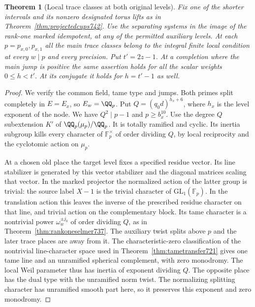 \documentclass[a4paper,11pt]{article}
\newtheorem{theorem}[proposition]{Theorem}
\theoremstyle{definition}
\theoremstyle{remark}
\numberwithin{equation}{section}
\begin{document}
\begin{theorem}[Local trace classes at both original levels]
\leavevmode\label{thm:oldtorustraces743}
Fix one of the shorter intervals and its nonzero designated torus
lifts as in Theorem~\ref{thm:projectedcups742}. Use the separating
systems in the image of the rank-one marked idempotent, at any of
the permitted auxiliary levels. At each \(p=p_{x,0},p_{x,1}\)
all the main trace classes belong to the integral finite local
condition at every \(w\mid p\) and every precision. Put
\(t'=2z-1\). At a completion where the main jump is positive the
same assertion holds for all the scalar weights \(0\le h<t'\).
At its conjugate it holds for \(h=t'-1\) as well.
\end{theorem}
\begin{proof}
We verify the common field, tame type and jumps. Both primes split
completely in \(E=E_x\), so \(E_w=\QQ_p\). Put \(Q=(q_0d)^{h_x+6}\),
where \(h_x\) is the level exponent of the node. We have
\(Q^2\mid p-1\) and \(p\ge b_x^{10}\). Use the degree \(Q\)
subextension \(K'\) of \(\QQ_p(\mu_p)/\QQ_p\). It is totally
ramified and cyclic. Its inertia subgroup kills every character
of \(\mathbb F_p^\times\) of order dividing \(Q\), by local
reciprocity and the cyclotomic action on \(\mu_p\).

At a chosen old place the target level fixes a specified residue
vector. Its line stabilizer is generated by this vector stabilizer
and the diagonal matrices scaling that vector. In the marked
projector the normalized action of the latter group is trivial:
the source label \(X-1\) is the trivial character of
\(\mathrm{GL}_1(\mathbb F_p)\). In the translation action this
leaves the inverse of the prescribed residue character on that
line, and trivial action on the complementary block. Its tame
character is a nontrivial power \(\omega_w^{\pm j_0}\) of order
dividing \(Q\), as in Theorem~\ref{thm:rankoneselmer737}.
The auxiliary twist splits above \(p\) and the later trace places
are away from it. The characteristic-zero classification of the
nontrivial line-character space used in
Theorem~\ref{thm:tametransfer721} gives one tame line and an
unramified spherical complement, with zero monodromy. The local
Weil parameter thus has inertia of exponent dividing \(Q\).
The opposite place has the dual type with the unramified norm
twist. The normalizing splitting character has unramified smooth
part here, so it preserves this exponent and zero monodromy.


\end{proof}
\end{document}
